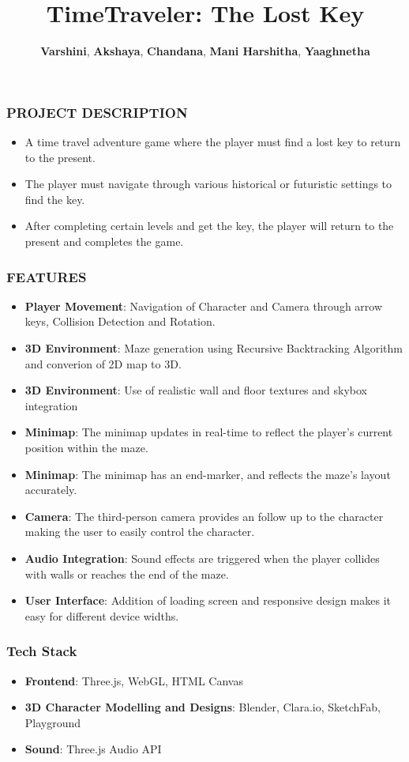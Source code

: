 \documentclass[9pt]{beamer}
\title{\textbf{TimeTraveler: The Lost Key}}
\author{ \textbf{Varshini}, \textbf{Akshaya}, \textbf{Chandana}, \textbf{Mani Harshitha}, \textbf{Yaaghnetha}}
\begin{document}
\begin{frame}
\titlepage
\end{frame}

\begin{frame}
    \frametitle{PROJECT DESCRIPTION}
    \begin{itemize}
        \item A time travel adventure game where the player must find a lost key to return to the present.
        \item The player must navigate through various historical or futuristic settings to find the key.
        \item After completing certain levels and get the key, the player will return to the present and completes the game.
    \end{itemize}
\end{frame}


\begin{frame}
    \frametitle{FEATURES}
    \begin{itemize}
        \item \textbf{Player Movement}: Navigation of Character and Camera through arrow keys, Collision Detection and Rotation.
        \item \textbf{3D Environment}: Maze generation using Recursive Backtracking Algorithm and converion of 2D map to 3D. 
        \item \textbf{3D Environment}: Use of realistic wall and floor textures and skybox integration
        \item \textbf{Minimap}: The minimap updates in real-time to reflect the player’s current position within the maze.
        \item \textbf{Minimap}: The minimap has an end-marker, and reflects the maze's layout accurately.
        \item \textbf{Camera}: The third-person camera provides an follow up to the character making the user to easily control the character.
        \item \textbf{Audio Integration}: Sound effects are triggered when the player collides with walls or reaches the end of the maze.
        \item \textbf{User Interface}: Addition of loading screen and responsive design makes it easy for different device widths.
    \end{itemize}
\end{frame}



\begin{frame}
\frametitle{Tech Stack}
\begin{itemize}
    \item \textbf{Frontend}: Three.js, WebGL, HTML Canvas
    \item \textbf{3D Character Modelling and Designs}: Blender, Clara.io, SketchFab, Playground
    \item \textbf{Sound}: Three.js Audio API
\end{itemize}
\end{frame}
\end{document}
